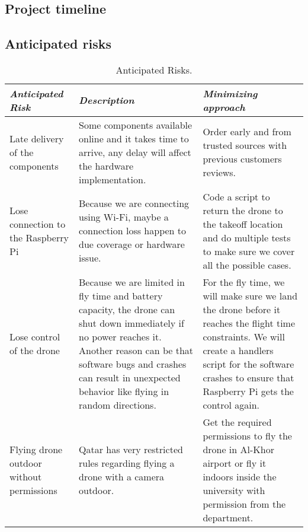\documentclass[../main.tex]{subfiles}
\begin{document}
\subsection{Project timeline}



\subsection{Anticipated risks}

\begin{table}[H]
	\centering
	\caption{Anticipated Risks.}
	\label{tab:Anticipated Risks}
        \begin{tabularx}{\textwidth}{ X X X }
		\toprule
		\textit{Anticipated Risk} 
		& \textit{Description} 
		& \textit{Minimizing approach} \\
		
		\midrule
		
		Late delivery of the components 
		& Some components available online 
		and it takes time to arrive, 
		any delay will affect the hardware implementation.
		& Order early and from trusted sources with previous 
		customers reviews. \\
		
		Lose connection to the Raspberry Pi
		& Because we are connecting using Wi-Fi, maybe a connection loss 
		happen to due coverage or hardware issue.
		& Code a script to return the drone to the takeoff location 
		and do multiple tests to make sure we cover all the possible cases. \\
		
		Lose control of the drone
		& Because we are limited in fly time and battery capacity, 
		the drone can shut down immediately if no power reaches it.
		Another reason can be that software bugs and crashes can 
		result in unexpected behavior like flying in random directions.
		& For the fly time, we will make sure we land the drone before it reaches the flight time constraints.
		We will create a handlers script for the software crashes 
		to ensure that Raspberry Pi gets the control again.  \\
		
		Flying drone outdoor without permissions 
		& Qatar has very restricted rules regarding flying a drone 
		with a camera outdoor.
		& Get the required permissions to fly the drone in 
		Al-Khor airport or fly it indoors inside the university with permission from the department. \\


\end{tabularx}
\end{table}
\end{document}
